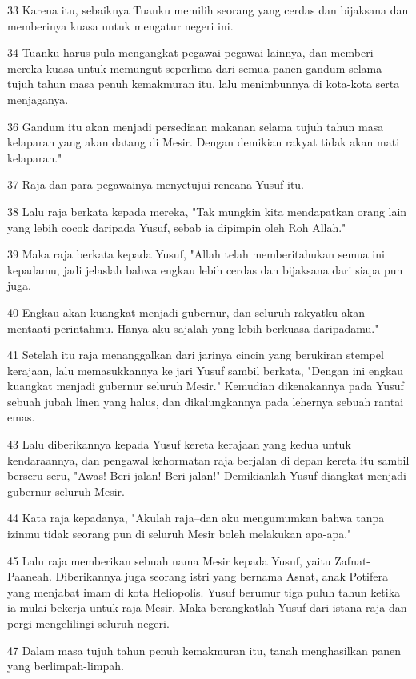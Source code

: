 \par 33 Karena itu, sebaiknya Tuanku memilih seorang yang cerdas dan bijaksana dan memberinya kuasa untuk mengatur negeri ini.
\par 34 Tuanku harus pula mengangkat pegawai-pegawai lainnya, dan memberi mereka kuasa untuk memungut seperlima dari semua panen gandum selama tujuh tahun masa penuh kemakmuran itu, lalu menimbunnya di kota-kota serta menjaganya.
\par 36 Gandum itu akan menjadi persediaan makanan selama tujuh tahun masa kelaparan yang akan datang di Mesir. Dengan demikian rakyat tidak akan mati kelaparan."
\par 37 Raja dan para pegawainya menyetujui rencana Yusuf itu.
\par 38 Lalu raja berkata kepada mereka, "Tak mungkin kita mendapatkan orang lain yang lebih cocok daripada Yusuf, sebab ia dipimpin oleh Roh Allah."
\par 39 Maka raja berkata kepada Yusuf, "Allah telah memberitahukan semua ini kepadamu, jadi jelaslah bahwa engkau lebih cerdas dan bijaksana dari siapa pun juga.
\par 40 Engkau akan kuangkat menjadi gubernur, dan seluruh rakyatku akan mentaati perintahmu. Hanya aku sajalah yang lebih berkuasa daripadamu."
\par 41 Setelah itu raja menanggalkan dari jarinya cincin yang berukiran stempel kerajaan, lalu memasukkannya ke jari Yusuf sambil berkata, "Dengan ini engkau kuangkat menjadi gubernur seluruh Mesir." Kemudian dikenakannya pada Yusuf sebuah jubah linen yang halus, dan dikalungkannya pada lehernya sebuah rantai emas.
\par 43 Lalu diberikannya kepada Yusuf kereta kerajaan yang kedua untuk kendaraannya, dan pengawal kehormatan raja berjalan di depan kereta itu sambil berseru-seru, "Awas! Beri jalan! Beri jalan!" Demikianlah Yusuf diangkat menjadi gubernur seluruh Mesir.
\par 44 Kata raja kepadanya, "Akulah raja--dan aku mengumumkan bahwa tanpa izinmu tidak seorang pun di seluruh Mesir boleh melakukan apa-apa."
\par 45 Lalu raja memberikan sebuah nama Mesir kepada Yusuf, yaitu Zafnat-Paaneah. Diberikannya juga seorang istri yang bernama Asnat, anak Potifera yang menjabat imam di kota Heliopolis. Yusuf berumur tiga puluh tahun ketika ia mulai bekerja untuk raja Mesir. Maka berangkatlah Yusuf dari istana raja dan pergi mengelilingi seluruh negeri.
\par 47 Dalam masa tujuh tahun penuh kemakmuran itu, tanah menghasilkan panen yang berlimpah-limpah.
